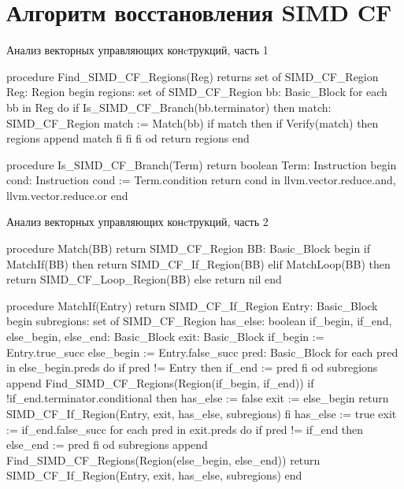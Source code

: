\chapter{Алгоритм восстановления SIMD CF}\label{app:A}

\begin{ListingEnv}[!h]
    \captiondelim{ } 
    \caption{Анализ векторных управляющих конcтрукций, часть 1}\label{lst:simdcf-analysis}
    \begin{Verb}
procedure Find_SIMD_CF_Regions(Reg) returns set of SIMD_CF_Region
  Reg: Region
begin
  regions: set of SIMD_CF_Region
  bb: Basic_Block
  for each bb in Reg do
    if Is_SIMD_CF_Branch(bb.terminator) then
      match: SIMD_CF_Region
      match := Match(bb)
      if match then
        if Verify(match) then
          regions append match
        fi
      fi
    fi
  od
  return regions
end

procedure Is_SIMD_CF_Branch(Term) return boolean
  Term: Instruction
begin
  cond: Instruction
  cond := Term.condition
  return cond in {llvm.vector.reduce.and, llvm.vector.reduce.or}
end
    \end{Verb}
\end{ListingEnv}

\begin{ListingEnv}[!h]
    \captiondelim{ } 
    \caption{Анализ векторных управляющих конcтрукций, часть 2}
    \begin{Verb}
procedure Match(BB) return SIMD_CF_Region
  BB: Basic_Block
begin
  if MatchIf(BB) then
    return SIMD_CF_If_Region(BB)
  elif MatchLoop(BB) then
    return SIMD_CF_Loop_Region(BB)
  else
    return nil
end

procedure MatchIf(Entry) return SIMD_CF_If_Region
  Entry: Basic_Block
begin
  subregions: set of SIMD_CF_Region
  has_else: boolean
  if_begin, if_end, else_begin, else_end: Basic_Block
  exit: Basic_Block
  if_begin := Entry.true_succ
  else_begin := Entry.false_succ
  pred: Basic_Block
  for each pred in else_begin.preds do
    if pred != Entry then
      if_end := pred
    fi
  od
  subregions append Find_SIMD_CF_Regions(Region(if_begin, if_end))
  if !if_end.terminator.conditional then
    has_else := false
    exit := else_begin
    return SIMD_CF_If_Region(Entry, exit, has_else, subregions)
  fi
  has_else := true
  exit := if_end.false_succ
  for each pred in exit.preds do
    if pred != if_end then
      else_end := pred
    fi
  od
  subregions append Find_SIMD_CF_Regions(Region(else_begin, else_end))
  return SIMD_CF_If_Region(Entry, exit, has_else, subregions)
end
    \end{Verb}
\end{ListingEnv}

